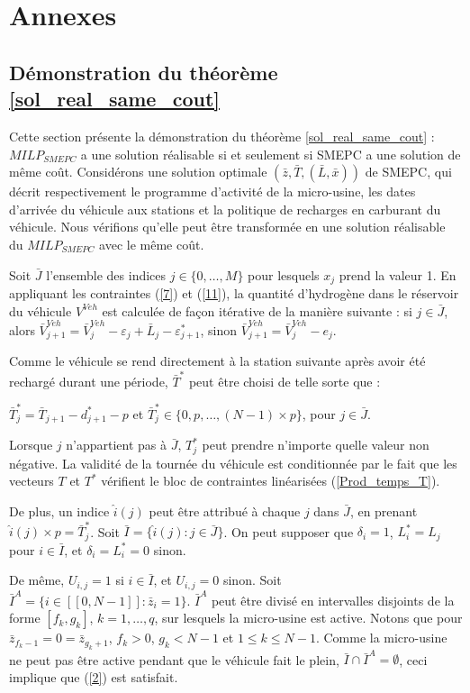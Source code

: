 {\section{Annexes}	

\subsection{Démonstration du théorème \ref{sol_real_same_cout}}

\label{sol_real_same_cout_section}
Cette section présente la démonstration du théorème \ref{sol_real_same_cout} : \textit{$MILP_{SMEPC}$} a une solution réalisable si et seulement si SMEPC a une solution de même coût.
Considérons une solution optimale $(\bar{z},\bar{T},(\bar{L},\bar{x}))$ de SMEPC, qui décrit respectivement le programme d'activité de la micro-usine, les dates d'arrivée du véhicule aux stations et la politique de recharges en carburant du véhicule. Nous vérifions qu'elle peut être transformée en une solution réalisable du \textit{$MILP_{SMEPC}$} avec le même coût.

Soit $\bar{J}$ l'ensemble des indices $j \in \{0, \dots, M\}$ pour lesquels $x_j$ prend la valeur 1. En appliquant les contraintes (\ref{7})
et (\ref{11}), la quantité d'hydrogène dans le réservoir du véhicule $V^{Veh}$ est calculée de façon itérative de la manière suivante : si $j \in \bar{J}$, alors $\bar{V}^{Veh}_{j+1}= \bar{V}^{Veh}_j - \varepsilon_{j} + \bar{L}_j - \varepsilon^*_{j+1}$, sinon $\bar{V}^{Veh}_{j+1}=\bar{V}^{Veh}_j-e_j$.

Comme le véhicule se rend directement à la station suivante après avoir été rechargé durant une période, $\bar{T}^*$ peut être choisi de telle sorte que :

$\bar{T}^*_j=\bar{T}_{j+1}-d^*_{j+1}-p$ et $\bar{T}^*_j \in \{0, p, \dots, (N-1)\times p\}$, pour $j \in \bar{J}$.

Lorsque $j$ n'appartient pas à $\bar{J}$, $T^*_j$ peut prendre n'importe quelle valeur non négative. La validité de la tournée du véhicule est conditionnée par le fait que les vecteurs $T$ et $T^*$ vérifient le bloc de contraintes linéarisées (\ref{Prod_temps_T}).

De plus, un indice $\hat{i}(j)$ peut être attribué à chaque $j$ dans $\bar{J}$, en prenant $\hat{i}(j) \times p =\bar{T}^*_j$. Soit $\bar{I}=\{\hat{i}(j) : j \in \bar{J} \}$. On peut supposer que $\delta_i=1$, $L^*_i=L_j$ pour $i \in \bar{I}$, et $\delta_i=L^*_i=0$ sinon.

De même, $U_{i,j} = 1$ si $i\in \bar{I}$, et $U_{i,j} = 0$ sinon.
Soit $\bar{I}^A = \{i \in [\![0,N-1]\!] : \bar{z}_i = 1\}$. $\bar{I}^A$ peut être divisé en intervalles disjoints de la forme $[f_k , g_k]$, $k = 1, \dots, q$, sur lesquels la micro-usine est active. Notons que pour $\bar{z}_{f_k-1} = 0 = \bar{z}_{g_k+1}$, $f_k > 0$, $g_k < N-1$ et $1 \leq k \leq N-1$. Comme la micro-usine ne peut pas être active pendant que le véhicule fait le plein, $\bar{I} \cap \bar{I}^A	= \emptyset$, ceci implique que (\ref{2}) est satisfait.

}

